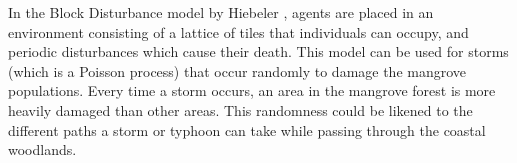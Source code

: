 In the Block Disturbance model by Hiebeler \cite{HiebelerFragmentedHabitat2011}, 
agents are placed in an environment consisting of a lattice of tiles that individuals can
occupy, and periodic disturbances which cause their death. This model
can be used for storms (which is a Poisson process) that occur randomly
to damage the mangrove populations. Every time a storm occurs, an area
in the mangrove forest is more heavily damaged than other areas. This
randomness could be likened to the different paths a storm or typhoon
can take while passing through the coastal woodlands.
